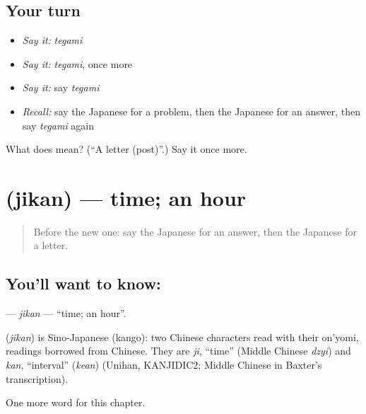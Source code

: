 \subsection*{Your turn}
\begin{itemize}
\raggedright
  \item \emph{Say it:} \emph{tegami}
  \item \emph{Say it:} \emph{tegami}, once more
  \item \emph{Say it:} say \emph{tegami}
  \item \emph{Recall:} say the Japanese for a problem, then the Japanese for an answer, then say \emph{tegami} again
\end{itemize}

\begin{tcolorbox}[breakable,colback=teal!4,colframe=teal!35!black,title={Before you move on}]
What does  mean? (\textquotedblleft{}A letter (post)\textquotedblright{}.) Say it once more.
\end{tcolorbox}
\section[\texorpdfstring{\ja{じかん} (jikan)}{じかん (jikan)}]{ (jikan) — time; an hour}

\label{lesson:JA-C41-jikan}



\begin{quote}
Before the new one: say the Japanese for an answer, then the Japanese for a letter.
\end{quote}

\subsection*{You'll want to know: }
\textbf{} — \emph{jikan} — \textquotedblleft{}time; an hour\textquotedblright{}.

\begin{cousinweb}
\textbf{} (\emph{jikan}) is Sino-Japanese (kango): two Chinese characters read with their on'yomi, readings borrowed from Chinese. They are \emph{ji}, \textquotedblleft{}time\textquotedblright{} (Middle Chinese \emph{dzyi}) and \emph{kan}, \textquotedblleft{}interval\textquotedblright{} (\emph{kean}) (Unihan, KANJIDIC2; Middle Chinese in Baxter's transcription).
\end{cousinweb}

\begin{grammarlens}[title={What you've built}]
One more word for this chapter.
\end{grammarlens}

